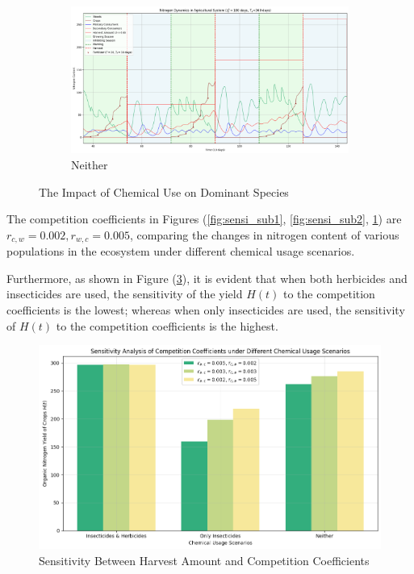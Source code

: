 \documentclass{mcmthesis}
\begin{document}
\begin{figure}[h]
\begin{subfigure}[b]{0.3\textwidth}
    \end{subfigure}
    \hfill 
    \begin{subfigure}[b]{0.3\textwidth}
        \centering
        \includegraphics[width=\textwidth]{figures/fig_sensi_chem_0.png}
        \caption{Neither}
        \label{fig:sensi_sub3}
    \end{subfigure}
    \caption{The Impact of Chemical Use on Dominant Species}
    \label{fig:main}
\end{figure}

The competition coefficients in Figures (\ref{fig:sensi_sub1}, \ref{fig:sensi_sub2}, \ref{fig:sensi_sub3}) are $r_{c,w} = 0.002, r_{w,c} = 0.005$, comparing the changes in nitrogen content of various populations in the ecosystem under different chemical usage scenarios.

Furthermore, as shown in Figure (\ref{fig:sensi_competition}), it is evident that when both herbicides and insecticides are used, the sensitivity of the yield $H(t)$ to the competition coefficients is the lowest; whereas when only insecticides are used, the sensitivity of $H(t)$ to the competition coefficients is the highest.

\begin{figure}[h]
    \centering
    \includegraphics[width=0.5\linewidth]{figures/fig_sensitive.png}
    \caption{Sensitivity Between Harvest Amount and Competition Coefficients}
    \label{fig:sensi_competition}
\end{figure}
\end{document}
